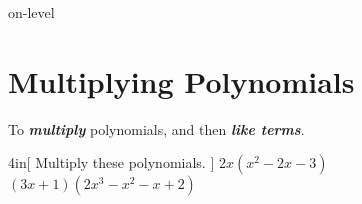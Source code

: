 \begin{taggedblock}{on-level}

\section{Multiplying Polynomials}

\vspace{-0.5em}
\begin{myCenteredBox}[colback=white,]
    To {\bfseries\itshape multiply} polynomials,
     and then  {\bfseries\itshape like terms}.
\end{myCenteredBox}

\vspace{-1em}
\begin{my2Problems}[\large]{4in}[
    Multiply these polynomials.
    ]
    {
        $ 2x (x^2 - 2x -3) $
    }
    {
        $ (3x+1) (2x^3 - x^2 -x + 2) $
    }
\end{my2Problems}

\end{taggedblock}

